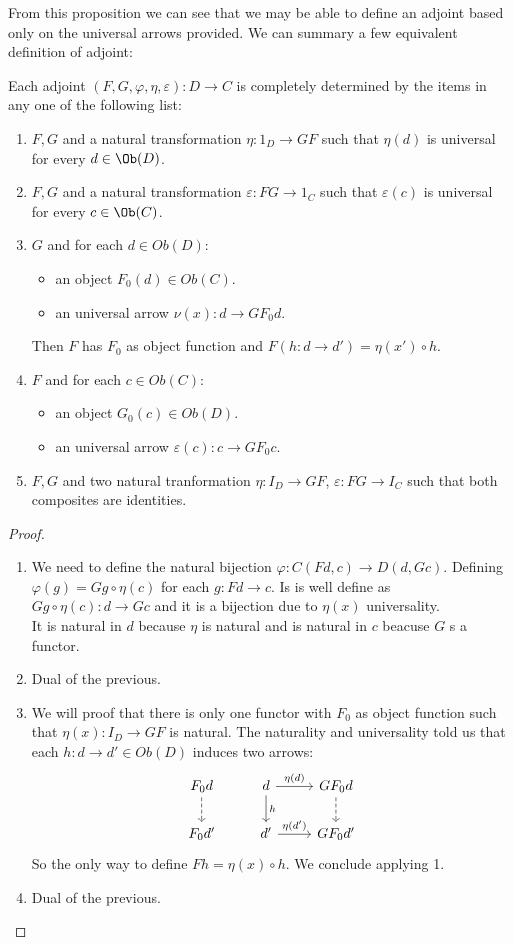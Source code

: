 From this proposition we can see that we may be able to define an adjoint based only on the universal arrows provided. We can summary a few equivalent definition of adjoint:
\begin{proposition}
  Each adjoint $(F,G,\varphi,\eta,\varepsilon):D\to C$ is completely determined by the items in any one of the following list:
  \begin{enumerate}
  \item $F,G$ and a natural transformation $\eta:1_D\to GF$ such that $\eta(d)$ is universal for every $d\in \Ob(D)$.
  \item $F,G$ and a natural transformation $\varepsilon:FG\to 1_C$ such that $\varepsilon(c)$ is universal for every $c\in \Ob(C)$.
  \item $G$ and for each $d\in Ob(D)$:
    \begin{itemize}
    \item an object $F_0(d)\in Ob(C)$.
    \item an universal arrow $\nu(x):d \to GF_0 d$.
    \end{itemize}
    Then $F$ has $F_0$ as object function and $F(h:d\to d') = \eta(x')\circ h$.
  \item $F$ and for each $c\in Ob(C)$:
    \begin{itemize}
    \item an object $G_0(c)\in Ob(D)$.
    \item an universal arrow $\varepsilon(c):c \to GF_0 c$.
    \end{itemize}
  \item  $F,G$ and two natural tranformation $\eta: I_D\to GF$, $\varepsilon: FG\to I_C$ such that both composites are identities.
  \end{enumerate}
\end{proposition}
\begin{proof}
  \begin{enumerate}
    
  \item We need to define the natural bijection $\varphi: C(Fd,c)\to D(d,Gc)$. Defining  $\varphi(g) = Gg\circ \eta(c)$ for each $g:Fd \to c$. Is is well define as $Gg\circ \eta(c): d\to Gc$ and it is a bijection  due to $\eta(x)$ universality.\\

    It is natural in $d$ because $\eta$ is natural and is natural in $c$ beacuse $G$ s a functor.
  \item Dual of the previous.
  \item We will proof that there is only one functor with $F_0$ as object function such that $\eta (x): I_D\to GF$ is natural. The naturality and universality told us that each $h:d\to d'\in Ob(D)$ induces two arrows:
\[
\begin{tikzcd}
  F_0 d\arrow[dashed]{d} & d\arrow{d}{h}\arrow{r}{\eta (d)}&GF_0d\arrow[dashed]{d}\\
  F_0 d'& d'\arrow{r}{\eta (d')} & GF_0d'
\end{tikzcd}
\]
    So the only way to define $Fh= \eta (x) \circ h$. We conclude applying 1.
  \item Dual of the previous.
  \end{enumerate}
\end{proof}
